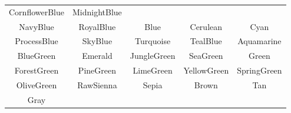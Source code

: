 \begin{center}
\begin{tabular}{ccccc}
		{\color{CornflowerBlue}CornflowerBlue} &
		{\color{MidnightBlue}MidnightBlue}     \\
		{\color{NavyBlue}NavyBlue}             &
		{\color{RoyalBlue}RoyalBlue}           &
		{\color{Blue}Blue}                     &
		{\color{Cerulean}Cerulean}             &
		{\color{Cyan}Cyan}                     \\
		{\color{ProcessBlue}ProcessBlue}       &
		{\color{SkyBlue}SkyBlue}               &
		{\color{Turquoise}Turquoise}           &
		{\color{TealBlue}TealBlue}             &
		{\color{Aquamarine}Aquamarine}         \\
		{\color{BlueGreen}BlueGreen}           &
		{\color{Emerald}Emerald}               &
		{\color{JungleGreen}JungleGreen}       &
		{\color{SeaGreen}SeaGreen}             &
		{\color{Green}Green}                   \\
		{\color{ForestGreen}ForestGreen}       &
		{\color{PineGreen}PineGreen}           &
		{\color{LimeGreen}LimeGreen}           &
		{\color{YellowGreen}YellowGreen}       &
		{\color{SpringGreen}SpringGreen}       \\ 
		{\color{OliveGreen}OliveGreen}         &
		{\color{RawSienna}RawSienna}           &
		{\color{Sepia}Sepia}                   &
		{\color{Brown}Brown}                   &
		{\color{Tan}Tan}                       \\
		{\color{Gray}Gray}
  \end{tabular}
\end{center}



